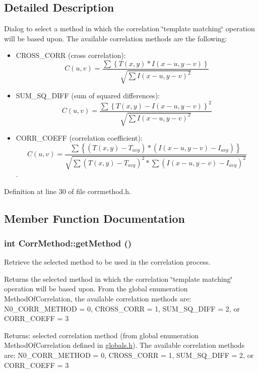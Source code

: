 \subsection{Detailed Description}
Dialog to select a method in which the correlation \char`\"{}template matching\char`\"{} operation will be based upon. The available correlation methods are the following:\begin{itemize}
\item CROSS\_\-CORR (cross correlation): \[ C(u,v) = \frac {\sum{\left\{T(x,y) * I(x-u,y-v)\right\}}} {\sqrt{ \sum{I(x-u,y-v)^2}}} \]\item SUM\_\-SQ\_\-DIFF (sum of squared differences): \[ C(u,v) = \frac {\sum{\left\{T(x,y)-I(x-u,y-v)\right\}^2}} {\sqrt{\sum{I(x-u,y-v)^2}}} \]\item CORR\_\-COEFF (correlation coefficient): \[ C(u,v) = \frac {\sum{\left\{(T(x,y)-T_{avg}) * (I(x-u,y-v)-I_{avg})\right\}}} {\sqrt{\sum{(T(x,y)-T_{avg})^2} * \sum{(I(x-u,y-v)-I_{avg})^2}}} \]. \end{itemize}


Definition at line 30 of file corrmethod.h.

\subsection{Member Function Documentation}
\hypertarget{classCorrMethod_3eeafdd901560c1fa92be75d4ed58872}{
\subsubsection[{getMethod}]{\setlength{\rightskip}{0pt plus 5cm}int CorrMethod::getMethod ()}}
\label{classCorrMethod_3eeafdd901560c1fa92be75d4ed58872}


Retrieve the selected method to be used in the correlation process. 

Returns the selected method in which the correlation \char`\"{}template matching\char`\"{} operation will be based upon. From the global enumeration MethodOfCorrelation, the available correlation methods are: N0\_\-CORR\_\-METHOD = 0, CROSS\_\-CORR = 1, SUM\_\-SQ\_\-DIFF = 2, or CORR\_\-COEFF = 3

\begin{Desc}
\item[Returns:]selected correlation method (from global enumeration MethodOfCorrelation defined in \hyperlink{globals_8h-source}{globals.h}). The available correlation methods are: N0\_\-CORR\_\-METHOD = 0, CROSS\_\-CORR = 1, SUM\_\-SQ\_\-DIFF = 2, or CORR\_\-COEFF = 3 \end{Desc}


